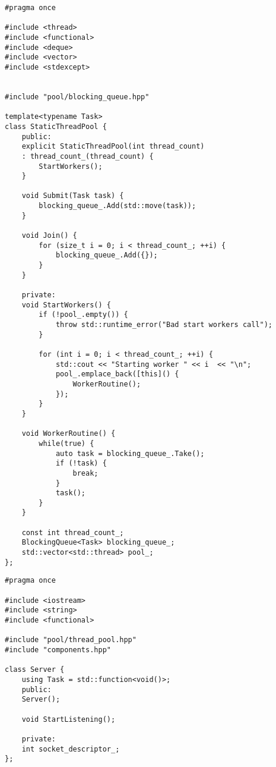 \begin{lstlisting}[caption=Реализация пула потоков]
#pragma once

#include <thread>
#include <functional>
#include <deque>
#include <vector>
#include <stdexcept>


#include "pool/blocking_queue.hpp"

template<typename Task>
class StaticThreadPool {
	public:
	explicit StaticThreadPool(int thread_count)
	: thread_count_(thread_count) {
		StartWorkers();
	}
	
	void Submit(Task task) {
		blocking_queue_.Add(std::move(task));
	}
	
	void Join() {
		for (size_t i = 0; i < thread_count_; ++i) {
			blocking_queue_.Add({});
		}
	}
	
	private:
	void StartWorkers() {
		if (!pool_.empty()) {
			throw std::runtime_error("Bad start workers call");
		}
		
		for (int i = 0; i < thread_count_; ++i) {
			std::cout << "Starting worker " << i  << "\n";
			pool_.emplace_back([this]() {
				WorkerRoutine();
			});
		}
	}
	
	void WorkerRoutine() {
		while(true) {
			auto task = blocking_queue_.Take();
			if (!task) {
				break;
			}
			task();
		}
	}
	
	const int thread_count_;
	BlockingQueue<Task> blocking_queue_;
	std::vector<std::thread> pool_;
};

\end{lstlisting}

\begin{lstlisting}[caption=Реализация сервара из файла server/server.hpp]
#pragma once

#include <iostream>
#include <string>
#include <functional>

#include "pool/thread_pool.hpp"
#include "components.hpp"

class Server {
	using Task = std::function<void()>;
	public:
	Server();
	
	void StartListening();
	
	private:
	int socket_descriptor_;
};

\end{lstlisting}

